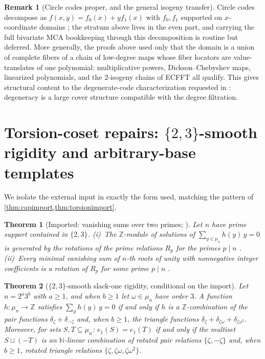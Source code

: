 \documentclass[11pt]{article}
\newtheorem{theorem}{Theorem}[section]
\theoremstyle{definition}
\newtheorem{remark}[remark]{Remark}
\newcommand{\Z}{\mathbb Z}
\newcommand{\N}{\mathbb N}
\newcommand{\mufn}{\mu_n}
\begin{document}
\begin{remark}[Circle codes proper, and the general isogeny transfer]\label{rem:isogeny}
Circle codes decompose as $f(x,y)=f_0(x)+yf_1(x)$ with $f_0,f_1$ supported on $x$-coordinate domains \cite{HLP24}; the stratum above lives in the even part, and carrying the full bivariate MCA bookkeeping through this decomposition is routine but deferred.  More generally, the proofs above used only that the domain is a union of complete fibers of a chain of low-degree maps whose fiber locators are value-translates of one polynomial: multiplicative powers, Dickson--Chebyshev maps, linearized polynomials, and the $2$-isogeny chains of ECFFT \cite{ECFFT} all qualify.  This gives structural content to the degenerate-code characterization requested in \cite{ABF26}: degeneracy is a large cover structure compatible with the degree filtration.
\end{remark}

\section{Torsion-coset repairs: \texorpdfstring{$\{2,3\}$}{(2,3)}-smooth rigidity and arbitrary-base templates}\label{sec:torsion}

We isolate the external input in exactly the form used, matching the pattern of \cref{thm:capimport,thm:torsionimport}.

\begin{theorem}[Imported: vanishing sums over two primes; \cite{Sch64,CJ76,LL00}]\label{thm:vsimport}
Let $n$ have prime support contained in $\{2,3\}$.  (i)~The $\Z$-module of solutions of $\sum_{y\in\mufn}h(y)\,y=0$ is generated by the rotations of the prime relations $R_p$ for the primes $p\mid n$ \cite{Sch64}.  (ii)~Every minimal vanishing sum of $n$-th roots of unity with nonnegative integer coefficients is a rotation of $R_p$ for some prime $p\mid n$ \cite{CJ76,LL00}.
\end{theorem}

\begin{theorem}[$\{2,3\}$-smooth slack-one rigidity, conditional on the import]\label{thm:23rigidity}
Let $n=2^a3^b$ with $a\ge1$, and when $b\ge1$ let $\omega\in\mufn$ have order $3$.  A function $h:\mufn\to\Z$ satisfies $\sum_yh(y)\,y=0$ if and only if $h$ is a $\Z$-combination of the pair functions $\delta_\zeta+\delta_{-\zeta}$ and, when $b\ge1$, the triangle functions $\delta_\zeta+\delta_{\zeta\omega}+\delta_{\zeta\omega^2}$.  Moreover, for sets $S,T\subseteq\mufn$: $e_1(S)=e_1(T)$ if and only if the multiset $S\sqcup(-T)$ is an $\N$-linear combination of rotated pair relations $\{\zeta,-\zeta\}$ and, when $b\ge1$, rotated triangle relations $\{\zeta,\zeta\omega,\zeta\omega^2\}$.
\end{theorem}
\end{document}
